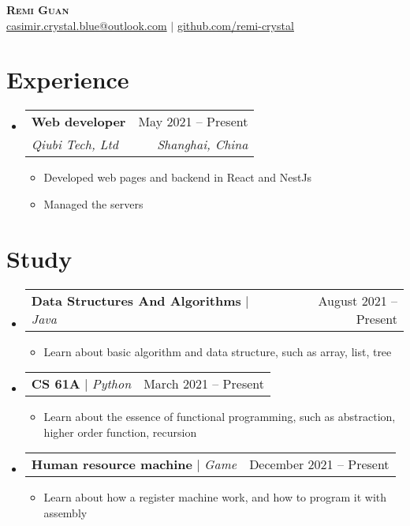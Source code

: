 \documentclass[letterpaper,11pt]{article}
\makeatletter
\newcommand{\resumeItem}[1]{
  \item\small{
    {#1 \vspace{-2pt}}
  }
}
\newcommand{\resumeSubheading}[4]{
  \vspace{-2pt}\item
    \begin{tabular*}{0.97\textwidth}[t]{l@{\extracolsep{\fill}}r}
      \textbf{#1} & #2 \\
      \textit{\small#3} & \textit{\small #4} \\
    \end{tabular*}\vspace{-7pt}
}
\newcommand{\resumeProjectHeading}[2]{
    \item
    \begin{tabular*}{0.97\textwidth}{l@{\extracolsep{\fill}}r}
      \small#1 & #2 \\
    \end{tabular*}\vspace{-7pt}
}
\newcommand{\resumeSubHeadingListStart}{\begin{itemize}[leftmargin=0.15in, label={}]}
\newcommand{\resumeSubHeadingListEnd}{\end{itemize}}
\newcommand{\resumeItemListStart}{\begin{itemize}}
\newcommand{\resumeItemListEnd}{\end{itemize}\vspace{-5pt}}
\makeatother
\begin{document}


\begin{center}
    \textbf{\Huge \scshape Remi Guan} \\ \vspace{1pt}
    \href{mailto:casimir.crystal.blue@outlook.com}{casimir.crystal.blue@outlook.com} $|$
    \href{https://github.com/remi-crystal}{\underline{github.com/remi-crystal}}
    
\end{center}


\section{Experience}
  \resumeSubHeadingListStart

    \resumeSubheading
      {Web developer}{May 2021 – Present}
      {Qiubi Tech, Ltd}{Shanghai, China}
      \resumeItemListStart
        \resumeItem{Developed web pages and backend in React and NestJs}
        \resumeItem{Managed the servers}
      \resumeItemListEnd
    \resumeSubHeadingListEnd

\section{Study}
  \resumeSubHeadingListStart
  
      \resumeProjectHeading
          {\textbf{Data Structures And 
Algorithms} $|$ \emph{Java}}{August 2021 -- Present}
          \resumeItemListStart
            \resumeItem{Learn about basic algorithm and data structure, such as array, list, tree}
          \resumeItemListEnd
          
      \resumeProjectHeading
          {\textbf{CS 61A} $|$ \emph{Python}}{March 2021 -- Present}
          \resumeItemListStart
            \resumeItem{Learn about the essence of functional programming, such as abstraction, higher order function, recursion}
          \resumeItemListEnd  
          
      \resumeProjectHeading
          {\textbf{Human resource machine} $|$ \emph{Game}}{December 2021 -- Present}
          \resumeItemListStart
            \resumeItem{Learn about how a register machine work, and how to program it with assembly}
          \resumeItemListEnd
          
    \resumeSubHeadingListEnd
\end{document}

